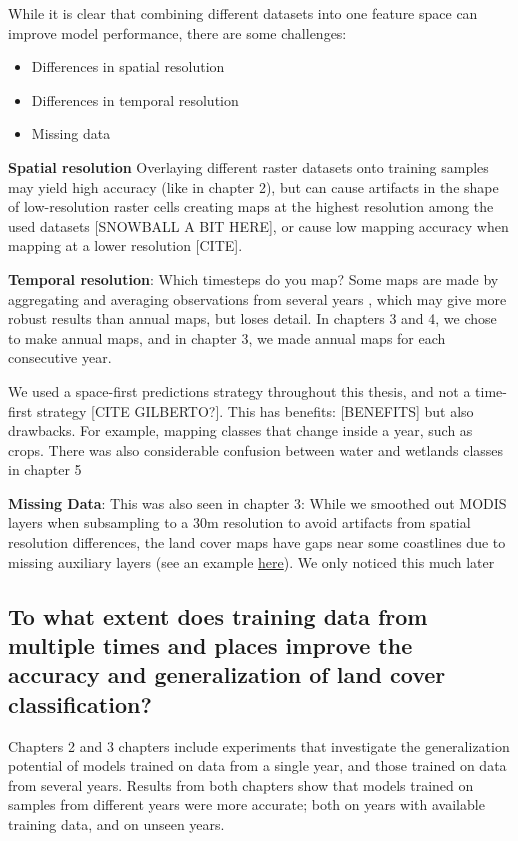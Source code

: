             While it is clear that combining different datasets into one feature space can improve model performance, there are some challenges:
            \begin{itemize}
            \item Differences in spatial resolution
            \item Differences in temporal resolution
            \item Missing data
            \end{itemize}
    
            \textbf{Spatial resolution}
            Overlaying different raster datasets onto training samples may yield high accuracy (like in chapter 2), but can cause artifacts in the shape of low-resolution raster cells creating maps at the highest resolution among the used datasets \citep{moller2019oblique} [SNOWBALL A BIT HERE], or cause low mapping accuracy when mapping at a lower resolution [CITE]. 
            
            \textbf{Temporal resolution}:   
            Which timesteps do you map? Some maps are made by aggregating and averaging observations from several years \citep{pflugmacher2019mapping,esa2023cci}, which may give more robust results than annual maps, but loses detail. In chapters 3 and 4, we chose to make annual maps, and in chapter 3, we made annual maps for each consecutive year. 
        
            We used a space-first predictions strategy throughout this thesis, and not a time-first strategy [CITE GILBERTO?]. This has benefits: [BENEFITS] but also drawbacks. For example, mapping classes that change inside a year, such as crops. There was also considerable confusion between water and wetlands classes in chapter 5
            
            \textbf{Missing Data}:
            This was also seen in chapter 3: While we smoothed out MODIS layers when subsampling to a 30m resolution to avoid artifacts from spatial resolution differences, the land cover maps have gaps near some coastlines due to missing auxiliary layers (see an example \href{https://ecodatacube.eu/?base=OpenStreetMap%20(grayscale)&layer=Land%20Cover%20&zoom=13.2&eye=5000000&center=52.4582,5.3267&opacity=100&time=2019}{here}). We only noticed this much later
    
    
    \subsection{To what extent does training data from multiple times and places improve the accuracy and generalization of land cover classification?}
    \label{syn:rq2}
        Chapters 2 and 3 chapters include experiments that investigate the generalization potential of models trained on data from a single year, and those trained on data from several years. Results from both chapters show that models trained on samples from different years were more accurate; both on years with available training data, and on unseen years.
        
